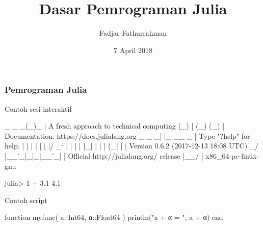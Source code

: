 \documentclass[bahasa,10pt]{beamer}
\begin{document}
\title{Dasar Pemrograman Julia}
\author{Fadjar Fathurrahman}
\date{7 April 2018}

\frame{\titlepage}

\begin{frame}[fragile]
\frametitle{Pemrograman Julia}

Contoh sesi interaktif
\begin{jlconcode}
   _       _ _(_)_     |  A fresh approach to technical computing
  (_)     | (_) (_)    |  Documentation: https://docs.julialang.org
   _ _   _| |_  __ _   |  Type "?help" for help.
  | | | | | | |/ _` |  |
  | | |_| | | | (_| |  |  Version 0.6.2 (2017-12-13 18:08 UTC)
 _/ |\__'_|_|_|\__'_|  |  Official http://julialang.org/ release
|__/                   |  x86_64-pc-linux-gnu

julia> 1 + 3.1
4.1
\end{jlconcode}

Contoh script
\begin{juliacode}
function myfunc( a::Int64, α::Float64 )
    println("a + α = ", a + α)
end
\end{juliacode}

\end{frame}
\end{document}
